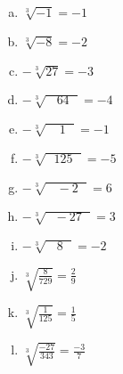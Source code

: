 \documentclass[a4paper,14pt]{article}
\begin{document}
\begin{multicols}{2}
\begin{enumerate}
\begin{enumerate}[a)]
        	\item $\sqrt[3]{-1} = -1$
        	\item $\sqrt[3]{-8} = -2$
        	\item $-\sqrt[3]{27} = -3$
        	\item $-\sqrt[3]{~~~~64~~~} = -4$
        	\item $-\sqrt[3]{~~~~~1~~~} = -1$
        	\item $-\sqrt[3]{~~~125~~~} = -5$
        	\item $-\sqrt[3]{~~~~-2~~~} = 6$
        	\item $-\sqrt[3]{~~~-27~~~} = 3$
        	\item $-\sqrt[3]{~~~~8~~~} = -2$
        	\item $\sqrt[3]{\frac{8}{729}} = \frac{2}{9}$
        	\item $\sqrt[3]{\frac{1}{125}} = \frac{1}{5}$
        	\item $\sqrt[3]{\frac{-27}{343}} = \frac{-3}{7}$
        \end{enumerate}
		
		
    \end{enumerate}        
    \end{multicols}    
\end{document}
